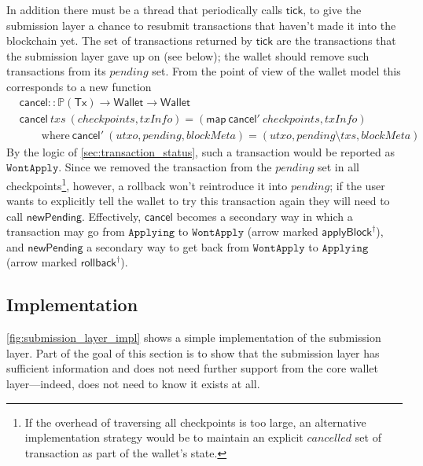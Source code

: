 \documentclass{article}
\theoremstyle{definition}{
  \newtheorem{lemma}{Lemma}[section] %
  \newtheorem{definition}[lemma]{Definition}
}
\theoremstyle{theorem}{
  \newtheorem{invariant}[lemma]{Invariant}
  \newtheorem{proofobligation}[lemma]{Proof Obligation}
}
\numberwithin{equation}{lemma}
\begin{document}
In addition there must be a thread that periodically calls $\mathsf{tick}$, to
give the submission layer a chance to resubmit transactions that haven't made it
into the blockchain yet. The set of transactions returned by $\mathsf{tick}$ are
the transactions that the submission layer gave up on (see below); the wallet
should remove such transactions from its $\mathit{pending}$ set. From the point
of view of the wallet model this corresponds to a new function
%
\begin{align*}
& \mathsf{cancel} :: \mathbb{P}(\mathsf{Tx}) \rightarrow \mathsf{Wallet} \rightarrow \mathsf{Wallet} \\
& \mathsf{cancel} ~ \mathit{txs} ~ (\mathit{checkpoints}, \mathit{txInfo}) = (\mathsf{map} ~ \mathsf{cancel'} ~ \mathit{checkpoints}, \mathit{txInfo}) \\
& \qquad \text{where} ~ \mathsf{cancel}' ~ (\mathit{utxo}, \mathit{pending}, \mathit{blockMeta}) = (\mathit{utxo}, \mathit{pending} \setminus \mathit{txs}, \mathit{blockMeta})
\end{align*}
%
By the logic of \cref{sec:transaction_status}, such a transaction would
be reported as $\mathtt{WontApply}$. Since we removed the transaction from the
$\mathit{pending}$ set in all checkpoints\footnote{If the overhead of traversing
all checkpoints is too large, an alternative implementation strategy would be to
maintain an explicit $\mathit{cancelled}$ set of transaction as part of the
wallet's state.}, however, a rollback won't reintroduce it into
$\mathit{pending}$; if the user wants to explicitly tell the wallet to try this
transaction again they will need to call $\mathsf{newPending}$. Effectively,
$\mathsf{cancel}$ becomes a secondary way in which a transaction may go from
$\texttt{Applying}$ to $\texttt{WontApply}$ (arrow marked $\mathsf{applyBlock}^\dagger$), and
$\mathsf{newPending}$ a secondary way to get back from $\texttt{WontApply}$ to
$\texttt{Applying}$ (arrow marked $\mathsf{rollback}^\dagger$).

\subsection{Implementation}
\label{sec:submission_implementation}

\cref{fig:submission_layer_impl} shows a simple implementation of the
submission layer.  Part of the goal of this section is to show that the
submission layer has sufficient information and does not need further support
from the core wallet layer---indeed, does not need to know it exists at all.
\end{document}
